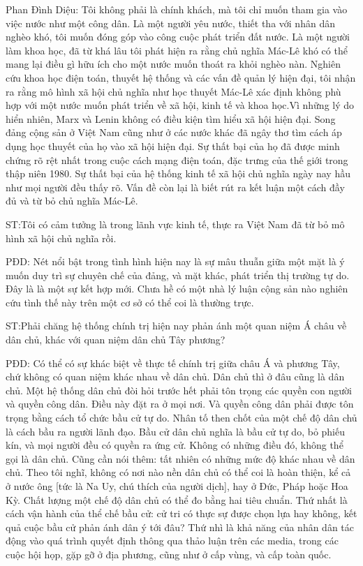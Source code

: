 Phan Đình Diệu: Tôi không phải là chính khách, mà tôi chỉ muốn tham gia vào việc nước như một công dân. Là một người yêu nước, thiết tha với nhân dân nghèo khó, tôi muốn đóng góp vào công cuộc phát triển đất nước. Là một người làm khoa học, đã từ khá lâu tôi phát hiện ra rằng chủ nghĩa Mác-Lê khó có thể mang lại điều gì hữu ích cho một nước muốn thoát ra khỏi nghèo nàn. Nghiên cứu khoa học điện toán, thuyết hệ thống và các vấn đề quản lý hiện đại, tôi nhận ra rằng mô hình xã hội chủ nghĩa như học thuyết Mác-Lê xác định không phù hợp với một nước muốn phát triển về xã hội, kinh tế và khoa học.Vì những lý do hiển nhiên, Marx và Lenin không có điều kiện tìm hiểu xã hội hiện đại. Song đảng cộng sản ở Việt Nam cũng như ở các nước khác đã ngây thơ tìm cách áp dụng học thuyết của họ vào xã hội hiện đại. Sự thất bại của họ đã được minh chứng rõ rệt nhất trong cuộc cách mạng điện toán, đặc trưng của thế giới trong thập niên 1980. Sự thất bại của hệ thống kinh tế xã hội chủ nghĩa ngày nay hầu như mọi người đều thấy rõ. Vấn đề còn lại là biết rút ra kết luận một cách đầy đủ và từ bỏ chủ nghĩa Mác-Lê.

ST:Tôi có cảm tưởng là trong lãnh vực kinh tế, thực ra Việt Nam đã từ bỏ mô hình xã hội chủ nghĩa rồi.

PĐD: Nét nổi bật trong tình hình hiện nay là sự mâu thuẫn giữa một mặt là ý muốn duy trì sự chuyên chế của đảng, và mặt khác, phát triển thị trường tự do. Đây là là một sự kết hợp mới. Chưa hề có một nhà lý luận cộng sản nào nghiên cứu tình thế này trên một cơ sở có thể coi là thường trực.

ST:Phải chăng hệ thống chính trị hiện nay phản ánh một quan niệm Á châu về dân chủ, khác với quan niệm dân chủ Tây phương?

PĐD: Có thể có sự khác biệt về thực tế chính trị giữa châu Á và phương Tây, chứ không có quan niệm khác nhau về dân chủ. Dân chủ thì ở đâu cũng là dân chủ. Một hệ thống dân chủ đòi hỏi trước hết phải tôn trọng các quyền con người và quyền công dân. Điều này đặt ra ở mọi nơi. Và quyền công dân phải được tôn trọng bằng cách tổ chức bầu cử tự do. Nhân tố then chốt của một chế độ dân chủ là cách bầu ra người lãnh đạo. Bầu cử dân chủ nghĩa là bầu cử tự do, bỏ phiếu kín, và mọi người đều có quyền ra ứng cử. Không có những điều đó, không thể gọi là dân chủ. Cũng cần nói thêm: tất nhiên có những mức độ khác nhau về dân chủ. Theo tôi nghĩ, không có nơi nào nền dân chủ có thể coi là hoàn thiện, kể cả ở nước ông [tức là Na Uy, chú thích của người dịch], hay ở Đức, Pháp hoặc Hoa Kỳ. Chất lượng một chế độ dân chủ có thể đo bằng hai tiêu chuẩn. Thứ nhất là cách vận hành của thể chế bầu cử: cử tri có thực sự được chọn lựa hay không, kết quả cuộc bầu cử phản ánh dân ý tới đâu? Thứ nhì là khả năng của nhân dân tác động vào quá trình quyết định thông qua thảo luận trên các media, trong các cuộc hội họp, gặp gỡ ở địa phương, cũng như ở cấp vùng, và cấp toàn quốc.


